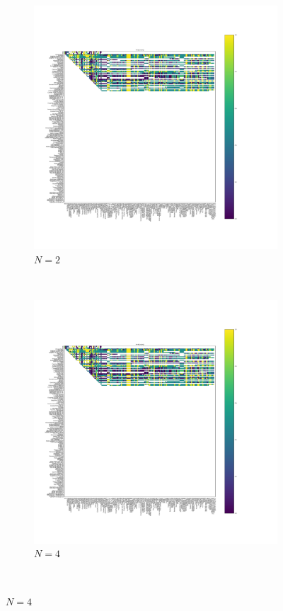 \documentclass{article}
\begin{document}
\begin{figure}[!hbtp]
    \centering
    \begin{subfigure}[t]{.3\textwidth}
        \centering
        \includegraphics[width=.8\textwidth]{../img/fixation_heatmap_2_noise.pdf}
        \caption{\(N=2\)}
    \end{subfigure}%
    ~
    \begin{subfigure}[t]{.3\textwidth}
        \centering
        \includegraphics[width=.8\textwidth]{../img/fixation_heatmap_4_noise.pdf}
        \caption{\(N=4\)}
    \end{subfigure}%
    ~

\end{figure}
\end{document}

